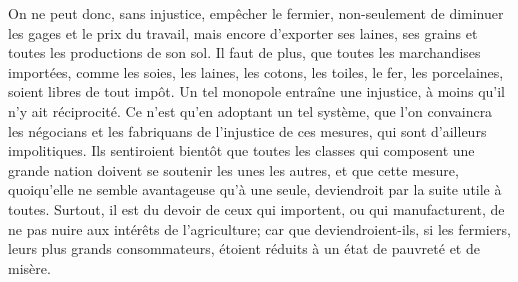 On ne peut donc, sans injustice, empêcher le fermier, non-seulement de diminuer les gages et le prix du travail, mais encore d'exporter ses laines, ses grains et toutes les productions de son sol. Il faut de plus, que toutes les marchandises importées, comme les soies, les laines, les cotons, les toiles, le fer, les porcelaines, soient libres de tout impôt. Un tel monopole entraîne une injustice, à moins qu'il n'y ait réciprocité. Ce n'est qu'en adoptant un tel système, que l'on convaincra\setcounter{page}{336} les négocians et les fabriquans de l'injustice de ces mesures, qui sont d'ailleurs impolitiques. Ils sentiroient bientôt que toutes les classes qui composent une grande nation doivent se soutenir les unes les autres, et que cette mesure, quoiqu'elle ne semble avantageuse qu'à une seule, deviendroit par la suite utile à toutes. Surtout, il est du devoir de ceux qui importent, ou qui manufacturent, de ne pas nuire aux intérêts de l'agriculture; car que deviendroient-ils, si les fermiers, leurs plus grands consommateurs, étoient réduits à un état de pauvreté et de misère.